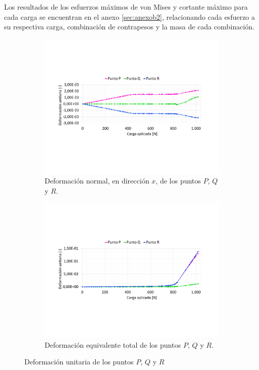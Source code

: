 Los resultados de los esfuerzos máximos de von Mises y cortante máximo para cada carga se encuentran en el anexo \ref{sec:anexob2}, relacionando cada esfuerzo a su respectiva carga, combinación de contrapesos y la masa de cada combinación. 

\begin{figure}[h]
\centering
	\begin{subfigure}{1\linewidth}
		\centering
		\includegraphics[width=\linewidth, trim={2cm 5cm 2cm 5cm},clip]{Imagenes/defpqr_normal.pdf}
		\caption{Deformación normal, en dirección $x$, de los puntos $P$, $Q$ y $R$.}
		\label{fig:defpqr_normal}
	\end{subfigure}
		\begin{subfigure}{1\linewidth}
		\centering
		\includegraphics[width=\linewidth, trim={2cm 5cm 2cm 5cm},clip]{Imagenes/defpqr_vmt.pdf}
		\caption{Deformación equivalente total de los puntos $P$, $Q$ y $R$.}
		\label{fig:defpqr_vmt}
	\end{subfigure}
\caption{Deformación unitaria de los puntos $P$, $Q$ y $R$  }
\label{fig:def_pqr}
\end{figure}

